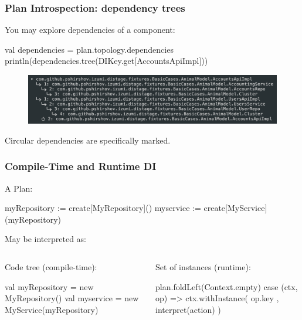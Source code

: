 \documentclass[usenames,dvipsnames]{beamer}
\begin{document}
\begin{frame}[fragile]
\frametitle{Plan Introspection: dependency trees}
You may explore dependencies of a component:

\begin{scalacode}
val dependencies = plan.topology.dependencies
println(dependencies.tree(DIKey.get[AccountsApiImpl]))
\end{scalacode}

\begin{figure}
    \includegraphics[width=\textwidth]{media/dependency-tree.png}
\end{figure}

Circular dependencies are specifically marked.
\end{frame}

\begin{frame}[fragile]
\begin{center}
\frametitle{Compile-Time and Runtime DI}
A Plan:
\begin{textcode}
myRepository := create[MyRepository]()
myservice    := create[MyService](myRepository)
\end{textcode}

May be interpreted as:

\begin{columns}

\begin{column}[T]{0.5\textwidth}
   \setlength{\topsep}{0pt}
   \setlength{\partopsep}{0pt}
Code tree (compile-time):
\begin{scalacode}
val myRepository =
    new MyRepository()
val myservice =
    new MyService(myRepository)
\end{scalacode}
\end{column}

\begin{column}[T]{0.5\textwidth}
Set of instances (runtime):
\begin{scalacode}
plan.foldLeft(Context.empty) {
case (ctx, op) =>
    ctx.withInstance(
        op.key
        , interpret(action)
    )
}
\end{scalacode}
\end{column}

\end{columns}
\end{center}
\end{frame}
\end{document}

